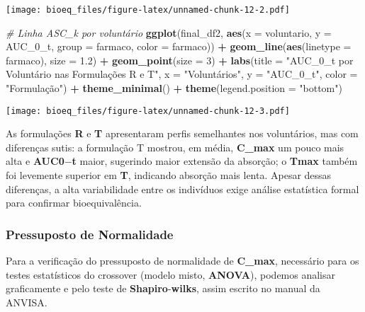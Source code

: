 \documentclass[
]{article}
\newenvironment{Shaded}{\begin{snugshade}}{\end{snugshade}}
\newcommand{\AttributeTok}[1]{\textcolor[rgb]{0.13,0.29,0.53}{#1}}
\newcommand{\CommentTok}[1]{\textcolor[rgb]{0.56,0.35,0.01}{\textit{#1}}}
\newcommand{\DecValTok}[1]{\textcolor[rgb]{0.00,0.00,0.81}{#1}}
\newcommand{\FloatTok}[1]{\textcolor[rgb]{0.00,0.00,0.81}{#1}}
\newcommand{\FunctionTok}[1]{\textcolor[rgb]{0.13,0.29,0.53}{\textbf{#1}}}
\newcommand{\NormalTok}[1]{#1}
\newcommand{\SpecialCharTok}[1]{\textcolor[rgb]{0.81,0.36,0.00}{\textbf{#1}}}
\newcommand{\StringTok}[1]{\textcolor[rgb]{0.31,0.60,0.02}{#1}}
\begin{document}
\texttt{[image: bioeq\_files/figure-latex/unnamed-chunk-12-2.pdf]}

\begin{Shaded}
\begin{Highlighting}[]
\CommentTok{\# Linha ASC\_k por voluntário}
\FunctionTok{ggplot}\NormalTok{(final\_df2, }\FunctionTok{aes}\NormalTok{(}\AttributeTok{x =}\NormalTok{ voluntario, }\AttributeTok{y =}\NormalTok{ AUC\_0\_t, }\AttributeTok{group =}\NormalTok{ farmaco, }\AttributeTok{color =}\NormalTok{ farmaco)) }\SpecialCharTok{+}
  \FunctionTok{geom\_line}\NormalTok{(}\FunctionTok{aes}\NormalTok{(}\AttributeTok{linetype =}\NormalTok{ farmaco), }\AttributeTok{size =} \FloatTok{1.2}\NormalTok{) }\SpecialCharTok{+}
  \FunctionTok{geom\_point}\NormalTok{(}\AttributeTok{size =} \DecValTok{3}\NormalTok{) }\SpecialCharTok{+}
  \FunctionTok{labs}\NormalTok{(}\AttributeTok{title =} \StringTok{"AUC\_0\_t por Voluntário nas Formulações R e T"}\NormalTok{,}
       \AttributeTok{x =} \StringTok{"Voluntários"}\NormalTok{, }\AttributeTok{y =} \StringTok{"AUC\_0\_t"}\NormalTok{, }\AttributeTok{color =} \StringTok{"Formulação"}\NormalTok{) }\SpecialCharTok{+}
  \FunctionTok{theme\_minimal}\NormalTok{() }\SpecialCharTok{+}
  \FunctionTok{theme}\NormalTok{(}\AttributeTok{legend.position =} \StringTok{"bottom"}\NormalTok{)}
\end{Highlighting}
\end{Shaded}

\texttt{[image: bioeq\_files/figure-latex/unnamed-chunk-12-3.pdf]}

As formulações \textbf{R} e \textbf{T} apresentaram perfis semelhantes
nos voluntários, mas com diferenças sutis: a formulação T mostrou, em
média, \textbf{C\_max} um pouco mais alta e \textbf{AUC0}−\textbf{t}
maior, sugerindo maior extensão da absorção; o \textbf{Tmax} também foi
levemente superior em \textbf{T}, indicando absorção mais lenta. Apesar
dessas diferenças, a alta variabilidade entre os indivíduos exige
análise estatística formal para confirmar bioequivalência.

\hypertarget{pressuposto-de-normalidade}{%
\subsubsection{Pressuposto de
Normalidade}\label{pressuposto-de-normalidade}}

Para a verificação do pressuposto de normalidade de \textbf{C\_max},
necessário para os testes estatísticos do crossover (modelo misto,
\textbf{ANOVA}), podemos analisar graficamente e pelo teste de
\textbf{Shapiro}-\textbf{wilks}, assim escrito no manual da ANVISA.
\end{document}
